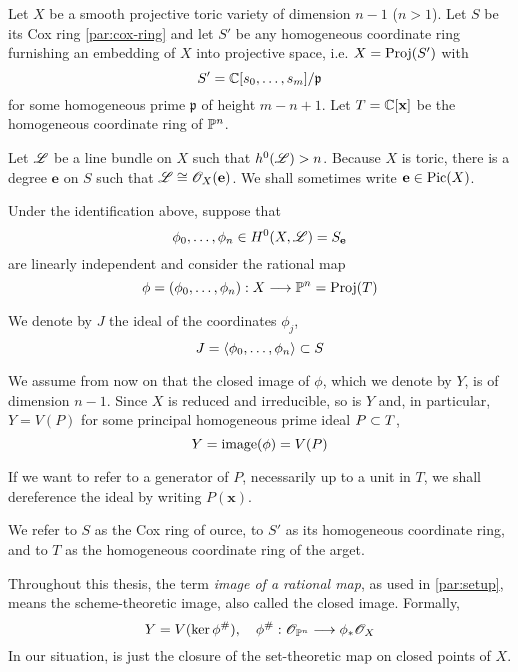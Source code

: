 \documentclass[fleqn,reqno]{amsart}
\numberwithin{first}{chapter}
\begin{document}
\begin{paragraf}
\label{par:setup}
Let $X$ be a smooth projective toric variety of dimension $n-1$ ($n>1$).
Let $S$ be its Cox ring \eqref{par:cox-ring} and
let $S'$ be any homogeneous coordinate ring
furnishing an embedding of $X$ into projective space, i.e. $X=\operatorname{Proj}(S')$ with
\[
	S'=\mathbb{C}[s_0,\ldots,s_m]/\mathfrak{p}
\]
for some homogeneous prime $\mathfrak{p}$ of height $m-n+1$.
Let $T=\mathbb{C}[\mathbf x]$ be the homogeneous coordinate ring of $\mathbb{P}^n$.

Let $\mathscr{L}$ be a line bundle on $X$ such that $h^0(\mathscr{L})> n$.
Because $X$ is toric,
there is a degree $\mathbf e$ on $S$ such that $\mathscr{L}\cong\mathscr{O}_X(\mathbf e)$.
We shall sometimes write $\mathbf e\in\operatorname{Pic}(X)$.

Under the identification above, suppose that
\[
\phi_0,\ldots,\phi_n\in H^0(X,\mathscr{L})=S_{\mathbf e}
\]
are linearly independent and consider the rational map
\[
	\phi=(\phi_0,\ldots,\phi_n):X\longrightarrow\mathbb{P}^n=\operatorname{Proj}(T)
\]

We denote by $J$ the ideal of the coordinates $\phi_j$,
\[
	J=\langle\phi_0,\ldots,\phi_n\rangle\subset S
\]

We assume from now on that the closed image of $\phi$, which we denote by $Y$,
is of dimension $n-1$.
Since $X$ is reduced and irreducible, so is $Y$ and, in particular,
$Y=V(P)$ for some principal homogeneous prime ideal $P\subset T$,
\[
	Y=\operatorname{image}(\phi)=V(P)
\]

If we want to refer to a generator of $P$, necessarily up to a unit in $T$,
we shall dereference the ideal by writing $P(\mathbf x)$.

We refer to $S$ as the Cox ring of ource, to $S'$ as its homogeneous coordinate ring,
and to $T$ as the homogeneous coordinate ring of the arget.
\end{paragraf}

\begin{remark}
Throughout this thesis, the term {\em image of a rational map}, as used in \eqref{par:setup},
means the scheme-theoretic image, also called the closed image. Formally,
\[
	Y = V(\ker\phi^\#),\quad \phi^\#:\mathscr{O}_{\mathbb{P}^n}\longrightarrow\phi_\ast\mathscr{O}_X
\]
In our situation,  is just the closure of the set-theoretic map on closed points of $X$.
\end{remark}
\end{document}
